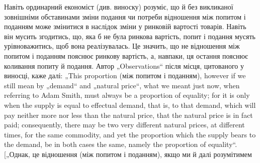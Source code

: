 Навіть ординарний економіст (див. виноску) розуміє, що
й без викликаної зовнішніми обставинами зміни подання чи потреби
відношення між попитом і поданням може змінитися
в наслідок зміни у ринковій вартості товарів. Навіть він мусить
згодитись, що, яка б не була ринкова вартість, попит і подання
мусять урівноважитись, щоб вона реалізувалась. Це значить,
що не відношення між попитом і поданням пояснює ринкову
вартість, а, навпаки, ця остання пояснює коливання попиту
й подання. Автор „Observations“ після місця, цитованого у виносці,
каже далі: „This proportion (між попитом і поданням),
however if we still mean by „demand“ and „natural price“, what
we meant just now, when referring to Adam Smith, must always
be a proportion of equality; for it is only when the supply is equal
to effectual demand, that is, to that demand, which will pay neither
more nor less than the natural price, that the natural price is in
fact paid; consequently, there may be two very different natural
prices, at different times, for the same commodity, and yet the
proportion which the supply bears to the demand, be in both cases
the same, namely the proportion of equality“. [„Однак, це відношення
(між попитом і поданням), якщо ми й далі розумітимем

